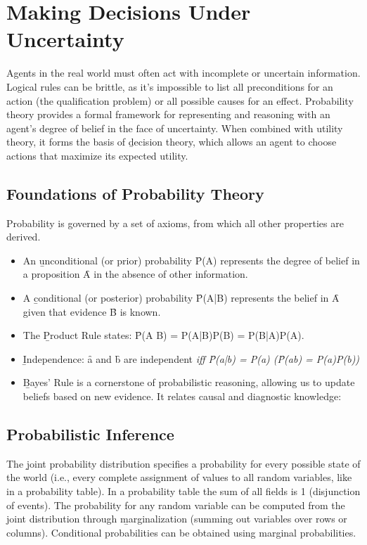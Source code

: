 \section{Making Decisions Under Uncertainty}
Agents in the real world must often act with incomplete or uncertain information. Logical rules can be brittle, as it's impossible to list all preconditions for an action (the qualification problem) or all possible causes for an effect. Probability theory provides a formal framework for representing and reasoning with an agent's degree of belief in the face of uncertainty. When combined with utility theory, it forms the basis of \b{decision theory}, which allows an agent to choose actions that maximize its expected utility.

\subsection{Foundations of Probability Theory}
Probability is governed by a set of axioms, from which all other properties are derived.
\begin{itemize}
    \item An \b{unconditional (or prior) probability} \f{P(A)} represents the degree of belief in a proposition \f{A} in the absence of other information.
    \item A \b{conditional (or posterior) probability} \f{P(A|B)} represents the belief in \f{A} given that evidence \f{B} is known.
    \item The \b{Product Rule} states: \f{P(A \wedge B) = P(A|B)P(B) = P(B|A)P(A)}.
    \item \b{Independence:} \f{a} and \f{b} are independent \it{iff} \f{P(a|b) = P(a)} (\f{\Rightarrow P(a\wedge b) = P(a)P(b)})
    \item \b{Bayes' Rule} is a cornerstone of probabilistic reasoning, allowing us to update beliefs based on new evidence. It relates causal and diagnostic knowledge:
\end{itemize}

\subsection{Probabilistic Inference}
The \b{joint probability distribution} specifies a probability for every possible state of the world (i.e., every complete assignment of values to all random variables, like in a probability table). In a probability table the sum of all fields is 1 (disjunction of events). The probability for any random variable can be computed from the joint distribution through \b{marginalization} (summing out variables over rows or columns). Conditional probabilities can be obtained using marginal probabilities.

